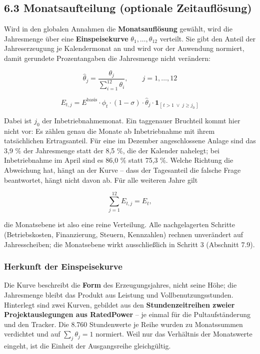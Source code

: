 \documentclass[
  a4paper,
  10pt]{article}
\begin{document}
\hypertarget{monatsaufteilung-optionale-zeitaufluxf6sung}{%
\subsection{6.3 Monatsaufteilung (optionale
Zeitauflösung)}\label{monatsaufteilung-optionale-zeitaufluxf6sung}}

Wird in den globalen Annahmen die \textbf{Monatsauflösung} gewählt, wird
die Jahresmenge über eine \textbf{Einspeisekurve}
\(\theta_1,\dots,\theta_{12}\) verteilt. Sie gibt den Anteil der
Jahreserzeugung je Kalendermonat an und wird vor der Anwendung normiert,
damit gerundete Prozentangaben die Jahresmenge nicht verändern:

\[ \hat{\theta}_j = \frac{\theta_j}{\sum_{i=1}^{12}\theta_i}, \qquad j = 1,\dots,12 \]

\[ E_{t,j} = E^{\mathrm{basis}} \cdot \phi_t \cdot (1-\sigma) \cdot \hat{\theta}_j \cdot \mathbf{1}_{[\,t>1 \;\vee\; j \geq j_0\,]} \]

Dabei ist \(j_0\) der Inbetriebnahmemonat. Ein taggenauer Bruchteil
kommt hier nicht vor: Es zählen genau die Monate ab Inbetriebnahme mit
ihrem tatsächlichen Ertragsanteil. Für eine im Dezember angeschlossene
Anlage sind das 3,9 \% der Jahresmenge statt der 8,5 \%, die der
Kalender nahelegt; bei Inbetriebnahme im April sind es 86,0 \% statt
75,3 \%. Welche Richtung die Abweichung hat, hängt an der Kurve -- dass
der Tagesanteil die falsche Frage beantwortet, hängt nicht davon ab. Für
alle weiteren Jahre gilt

\[ \sum_{j=1}^{12} E_{t,j} = E_t, \]

die Monatsebene ist also eine reine Verteilung. Alle nachgelagerten
Schritte (Betriebskosten, Finanzierung, Steuern, Kennzahlen) rechnen
unverändert auf Jahresscheiben; die Monatsebene wirkt ausschließlich in
Schritt 3 (Abschnitt 7.9).

\hypertarget{herkunft-der-einspeisekurve}{%
\subsubsection{Herkunft der
Einspeisekurve}\label{herkunft-der-einspeisekurve}}

Die Kurve beschreibt die \textbf{Form} des Erzeugungsjahres, nicht seine
Höhe; die Jahresmenge bleibt das Produkt aus Leistung und
Vollbenutzungsstunden. Hinterlegt sind zwei Kurven, gebildet aus den
\textbf{Stundenzeitreihen zweier Projektauslegungen aus RatedPower} --
je einmal für die Pultaufständerung und den Tracker. Die 8.760
Stundenwerte je Reihe wurden zu Monatssummen verdichtet und auf
\(\sum_j \theta_j = 1\) normiert. Weil nur das Verhältnis der
Monatswerte eingeht, ist die Einheit der Ausgangsreihe gleichgültig.
\end{document}
